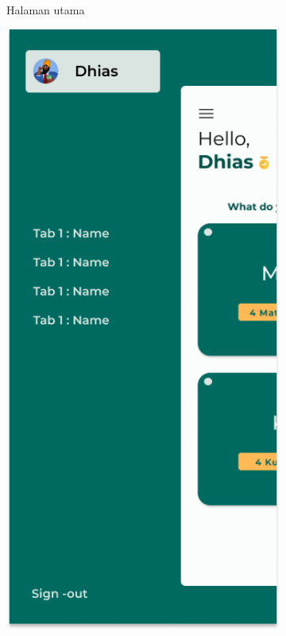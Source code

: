 \begin{figure}[H]
\begin{subfigure}[b]{0.24\textwidth}
	  \caption{Halaman utama}
	  \label{fig:HasilMainDash}
	\end{subfigure}
	\begin{subfigure}[b]{0.24\textwidth}
		\centering
	  \includegraphics[width=\linewidth]{contents/chapter-3/images/HF-Drawer.png}

\end{subfigure}
\end{figure}
